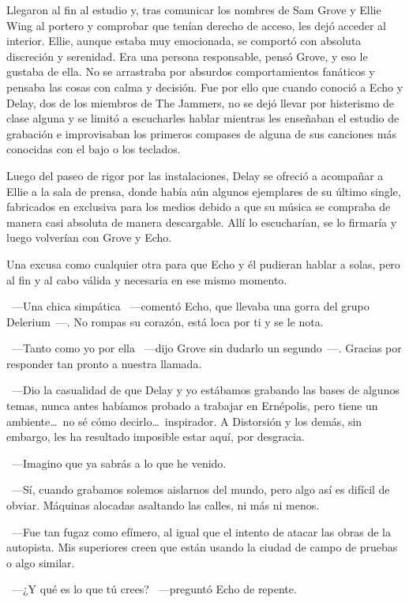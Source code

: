 Llegaron al fin al estudio y, tras comunicar los nombres de Sam Grove y Ellie Wing al portero y comprobar que tenían derecho de acceso, les dejó acceder al interior. Ellie, aunque estaba muy emocionada, se comportó con absoluta discreción y serenidad. Era una persona responsable, pensó Grove, y eso le gustaba de ella. No se arrastraba por absurdos comportamientos fanáticos y pensaba las cosas con calma y decisión. Fue por ello que cuando conoció a Echo y Delay, dos de los miembros de The Jammers, no se dejó llevar por histerismo de clase alguna y se limitó a escucharles hablar mientras les enseñaban el estudio de grabación e improvisaban los primeros compases de alguna de sus canciones más conocidas con el bajo o los teclados.

Luego del paseo de rigor por las instalaciones, Delay se ofreció a acompañar a Ellie a la sala de prensa, donde había aún algunos ejemplares de su último single, fabricados en exclusiva para los medios debido a que su música se compraba de manera casi absoluta de manera descargable. Allí lo escucharían, se lo firmaría y luego volverían con Grove y Echo.

Una excusa como cualquier otra para que Echo y él pudieran hablar a solas, pero al fin y al cabo válida y necesaria en ese mismo momento.

~---Una chica simpática ~---comentó Echo, que llevaba una gorra del grupo Delerium~---. No rompas su corazón, está loca por ti y se le nota.

~---Tanto como yo por ella ~---dijo Grove sin dudarlo un segundo~---. Gracias por responder tan pronto a nuestra llamada.

~---Dio la casualidad de que Delay y yo estábamos grabando las bases de algunos temas, nunca antes habíamos probado a trabajar en Ernépolis, pero tiene un ambiente\dots\ no sé cómo decirlo\dots\ inspirador. A Distorsión y los demás, sin embargo, les ha resultado imposible estar aquí, por desgracia.

~---Imagino que ya sabrás a lo que he venido.

~---Sí, cuando grabamos solemos aislarnos del mundo, pero algo así es difícil de obviar. Máquinas alocadas asaltando las calles, ni más ni menos.

~---Fue tan fugaz como efímero, al igual que el intento de atacar las obras de la autopista. Mis superiores creen que están usando la ciudad de campo de pruebas o algo similar.

~---¿Y qué es lo que tú crees? ~---preguntó Echo de repente.

